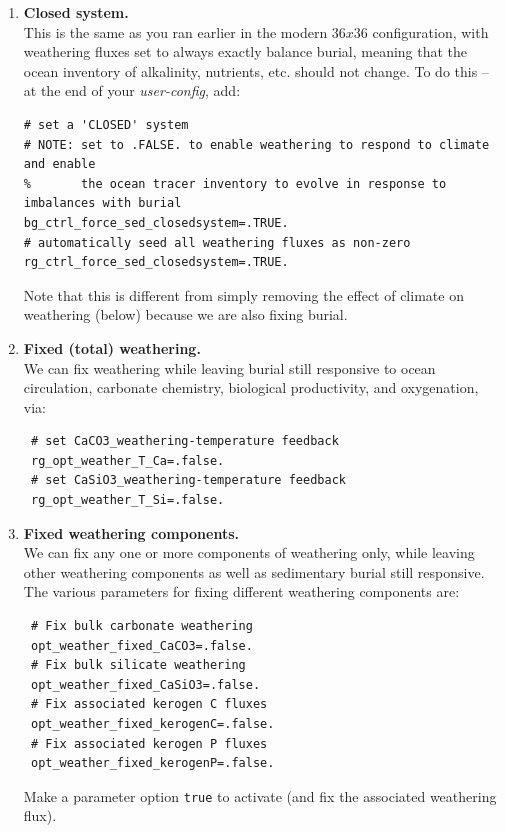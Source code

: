 \vspace{1mm}
\begin{enumerate}[noitemsep]

\vspace{1mm}
\item \textbf{Closed system.}
\vspace{1mm}
\\This is the same as you ran earlier in the modern $36x36$ configuration, with weathering fluxes set to always exactly balance burial, meaning that the ocean inventory of alkalinity, nutrients, etc. should not change. To do this -- at the end of your \textit{user-config}, add:
\vspace{-1mm}\small\begin{verbatim}
# set a 'CLOSED' system
# NOTE: set to .FALSE. to enable weathering to respond to climate and enable
%       the ocean tracer inventory to evolve in response to imbalances with burial
bg_ctrl_force_sed_closedsystem=.TRUE.
# automatically seed all weathering fluxes as non-zero
rg_ctrl_force_sed_closedsystem=.TRUE.
\end{verbatim}\normalsize\vspace{-1mm}
Note that this is different from simply removing the effect of climate on weathering (below) because we are also fixing burial.

\vspace{1mm}
\item \textbf{Fixed (total) weathering.}
\vspace{1mm}
\\We can fix weathering while leaving burial still responsive to ocean circulation, carbonate chemistry, biological productivity, and oxygenation, via:
\vspace{-1mm}\small\begin{verbatim}
 # set CaCO3_weathering-temperature feedback
 rg_opt_weather_T_Ca=.false.
 # set CaSiO3_weathering-temperature feedback
 rg_opt_weather_T_Si=.false.
\end{verbatim}\normalsize\vspace{-1mm}

\vspace{1mm}
\item \textbf{Fixed weathering components.}
\vspace{1mm}
\\We can fix any one or more components of weathering only, while leaving other weathering components as well as sedimentary burial still responsive. The various parameters for fixing different weathering components are:
\vspace{-1mm}\small\begin{verbatim}
 # Fix bulk carbonate weathering
 opt_weather_fixed_CaCO3=.false.
 # Fix bulk silicate weathering
 opt_weather_fixed_CaSiO3=.false.
 # Fix associated kerogen C fluxes
 opt_weather_fixed_kerogenC=.false.
 # Fix associated kerogen P fluxes
 opt_weather_fixed_kerogenP=.false.
\end{verbatim}\normalsize\vspace{-2mm}
Make a parameter option \texttt{\small true} to activate (and fix the associated weathering flux). 
                   

\end{enumerate}
